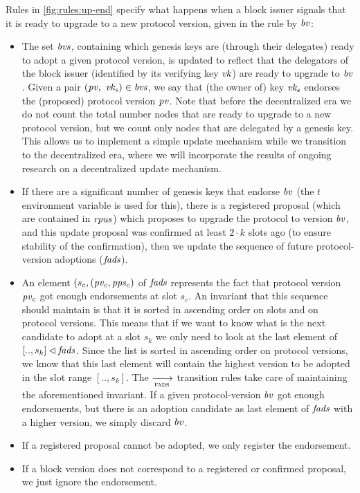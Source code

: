 Rules in \cref{fig:rules:up-end} specify what happens when a block issuer
signals that it is ready to upgrade to a new protocol version, given in the
rule by $\mathit{bv}$:
\begin{itemize}
\item The set $\mathit{bvs}$, containing which genesis keys are (through their
  delegates) ready to adopt a given protocol version, is updated to reflect
  that the delegators of the block issuer (identified by its verifying key
  $\mathit{vk}$) are ready to upgrade to $\mathit{bv}$. Given a pair
  $(\mathit{pv}, ~\mathit{vk_s}) \in \mathit{bvs}$, we say that (the owner of) key
  $\mathit{vk_s}$ endorses the (proposed) protocol version $\mathit{pv}$.
  Note that before the decentralized era we do not count the total number nodes
  that are ready to upgrade to a new protocol version, but we count only nodes
  that are delegated by a genesis key. This allows us to implement a simple
  update mechanism while we transition to the decentralized era, where we will
  incorporate the results of ongoing research on a decentralized update
  mechanism.
\item If there are a significant number of genesis keys that endorse $\mathit{bv}$
  (the $t$ environment variable is used for this), there is a registered
  proposal (which are contained in $\mathit{rpus}$) which proposes to upgrade the
  protocol to version $\mathit{bv}$, and this update proposal was confirmed at
  least $2 \cdot k$ slots ago (to ensure stability of the confirmation), then
  we update the sequence of future protocol-version adoptions ($\mathit{fads}$).
\item An element $(s_c, (\mathit{pv_c}, \mathit{pps_c})$ of $\mathit{fads}$ represents
  the fact that protocol version $\mathit{pv_c}$ got enough endorsements at slot
  $s_c$. An invariant that this sequence should maintain is that it is sorted
  in ascending order on slots and on protocol versions. This means that if we
  want to know what is the next candidate to adopt at a slot $s_k$ we only need
  to look at the last element of $[.., s_k] \lhd \mathit{fads}$. Since the
  list is sorted in ascending order on protocol versions, we know that this
  last element will contain the highest version to be adopted in the slot range
  $[.., s_k]$. The $\trans{fads}{}$ transition rules take care of maintaining
  the aforementioned invariant. If a given protocol-version $\mathit{bv}$ got
  enough endorsements, but there is an adoption candidate as last element of
  $\mathit{fads}$ with a higher version, we simply discard $\mathit{bv}$.
\item If a registered proposal cannot be adopted, we only register the
  endorsement.
\item If a block version does not correspond to a registered or confirmed
  proposal, we just ignore the endorsement.
\end{itemize}

